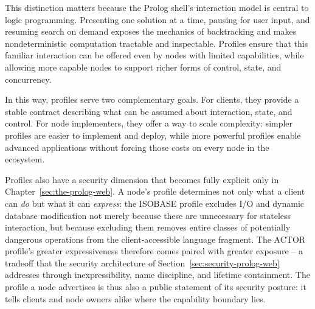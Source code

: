 This distinction matters because the Prolog shell's interaction model is central to logic programming. Presenting one solution at a time, pausing for user input, and resuming search on demand exposes the mechanics of backtracking and makes nondeterministic computation tractable and inspectable. Profiles ensure that this familiar interaction can be offered even by nodes with limited capabilities, while allowing more capable nodes to support richer forms of control, state, and concurrency.

In this way, profiles serve two complementary goals. For clients, they provide a stable contract describing what can be assumed about interaction, state, and control. For node implementers, they offer a way to scale complexity: simpler profiles are easier to implement and deploy, while more powerful profiles enable advanced applications without forcing those costs on every node in the ecosystem.

Profiles also have a security dimension that becomes fully explicit only in
Chapter~\ref{sec:the-prolog-web}. A node's profile determines not only what a
client can \emph{do} but what it can \emph{express}: the ISOBASE profile excludes
I/O and dynamic database modification not merely because these are unnecessary
for stateless interaction, but because excluding them removes entire classes of
potentially dangerous operations from the client-accessible language fragment.
The ACTOR profile's greater expressiveness therefore comes paired with greater
exposure -- a tradeoff that the security architecture of Section~\ref{sec:security-prolog-web}
addresses through inexpressibility, name discipline, and lifetime containment.
The profile a node advertises is thus also a public statement of its security posture:
it tells clients and node owners alike where the capability boundary lies.

